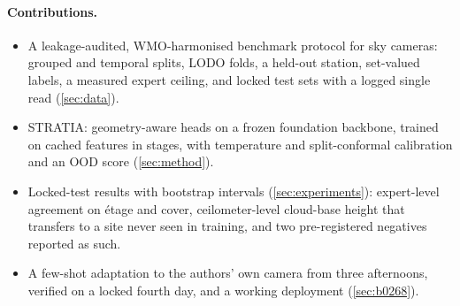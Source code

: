 \paragraph{Contributions.}
\begin{itemize}
\item A leakage-audited, WMO-harmonised benchmark protocol for sky cameras: grouped and temporal splits, LODO
  folds, a held-out station, set-valued labels, a measured expert ceiling, and locked test sets with a logged
  single read (\cref{sec:data}).
\item STRATIA: geometry-aware heads on a frozen foundation backbone, trained on cached features in stages, with
  temperature and split-conformal calibration and an OOD score (\cref{sec:method}).
\item Locked-test results with bootstrap intervals (\cref{sec:experiments}): expert-level agreement on
  \'etage and cover, ceilometer-level cloud-base height that transfers to a site never seen in training, and two
  pre-registered negatives reported as such.
\item A few-shot adaptation to the authors' own camera from three afternoons, verified on a locked fourth day, and
  a working deployment (\cref{sec:b0268}).
\end{itemize}
